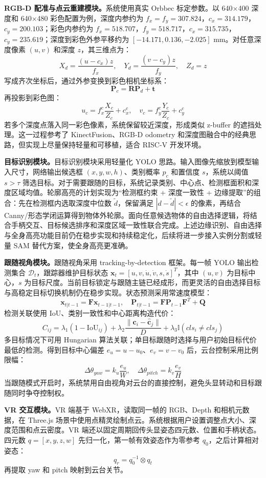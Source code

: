 \documentclass[UTF8,a4paper,zihao=-4]{ctexart}
\begin{document}
\textbf{RGB-D 配准与点云重建模块。}系统使用真实 Orbbec 标定参数。以 640$\times$400 深度和 640$\times$480 彩色配置为例，深度内参约为 $f_x=f_y=307.824$，$c_x=314.179$，$c_y=200.103$；彩色内参约为 $f_x=518.707$，$f_y=518.717$，$c_x=315.735$，$c_y=235.619$；深度到彩色外参平移约为 $[-14.171,0.136,-2.025]$ mm。对任意深度像素 $(u,v)$ 和深度 $z$，其三维点为：
\[
X_d=\frac{(u-c_x)z}{f_x},\quad Y_d=\frac{(v-c_y)z}{f_y},\quad Z_d=z
\]
写成齐次坐标后，通过外参变换到彩色相机坐标系：
\[
\mathbf{P}_c=\mathbf{R}\mathbf{P}_d+\mathbf{t}
\]
再投影到彩色图：
\[
u_c=f_x^c\frac{X_c}{Z_c}+c_x^c,\quad v_c=f_y^c\frac{Y_c}{Z_c}+c_y^c
\]
若多个深度点落入同一彩色像素，系统保留较近深度，形成类似 z-buffer 的遮挡处理。这一过程参考了 KinectFusion、RGB-D odometry 和深度图融合中的经典思路，但实现上尽量保持轻量和可移植，适合 RISC-V 开发环境。

\textbf{目标识别模块。}目标识别模块采用轻量化 YOLO 思路。输入图像先缩放到模型输入尺寸，网络输出候选框 $(x,y,w,h)$、类别概率 $p_c$ 和置信度 $s$，系统以阈值 $s>\tau$ 筛选目标。对于需要跟随的目标，系统记录类别、中心点、检测框面积和深度区域均值。轮廓高亮的计划实现为“检测框约束 + 深度一致性 + 边缘提取”的组合：先在检测框内选取深度中位数 $\tilde{d}$，保留满足 $|d-\tilde{d}|<\epsilon$ 的像素，再结合 Canny/形态学闭运算得到物体外轮廓。面向任意候选物体的自由选择逻辑，将结合手柄交互、目标候选排序和深度区域一致性联合完成。上述边缘识别、自由选择与全身高亮功能目前仍在稳步实现和持续稳定化，后续将进一步接入实例分割或轻量 SAM 替代方案，使全身高亮更准确。

\textbf{跟随视角模块。}跟随视角采用 tracking-by-detection 框架。每一帧 YOLO 输出检测集合 $\mathcal{D}_t$，跟踪器维护目标状态 $\mathbf{x}_t=[u,v,\dot{u},\dot{v},s,\dot{s}]^T$，其中 $(u,v)$ 为目标中心，$s$ 为目标尺度。当前目标锁定与跟随主链已经成形，而更灵活的自由选择目标与高稳定目标切换机制仍在稳步实现。状态预测采用常速度模型：
\[
\mathbf{x}_{t|t-1}=\mathbf{F}\mathbf{x}_{t-1|t-1},\quad
\mathbf{P}_{t|t-1}=\mathbf{F}\mathbf{P}_{t-1}\mathbf{F}^T+\mathbf{Q}
\]
检测关联使用 IoU、类别一致性和中心距离构造代价：
\[
C_{ij}=\lambda_1(1-\mathrm{IoU}_{ij})+\lambda_2\frac{\|\mathbf{c}_i-\hat{\mathbf{c}}_j\|}{D}+\lambda_3\mathbb{I}(cls_i\ne cls_j)
\]
多目标情况下可用 Hungarian 算法关联；单目标跟随时选择与用户初始目标代价最低的检测。得到目标中心偏差 $e_u=u-u_0$、$e_v=v-v_0$ 后，云台控制采用比例限幅：
\[
\Delta \theta_{yaw}=k_u\frac{e_u}{W},\quad \Delta \theta_{pitch}=k_v\frac{e_v}{H}
\]
当跟随模式开启时，系统禁用自由视角对云台的直接控制，避免头显转动和目标跟随同时争夺控制权。

\textbf{VR 交互模块。}VR 端基于 WebXR，读取同一帧的 RGB、Depth 和相机元数据，在 Three.js 场景中使用点精灵绘制点云。系统根据用户设置调整点大小、深度范围和点云密度。VR 端还以固定周期回传头显姿态四元数、位置和手柄状态。四元数 $q=[x,y,z,w]$ 先归一化，第一帧有效姿态作为零参考 $q_0$，之后计算相对姿态：
\[
q_r=q_0^{-1}\otimes q_t
\]
再提取 yaw 和 pitch 映射到云台关节。
\end{document}
